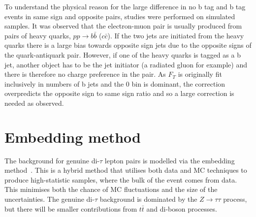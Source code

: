 To understand the physical reason for the large difference in no b tag and b tag events in same sign and opposite pairs, studies were performed on simulated samples.
It was observed that the electron-muon pair is usually produced from pairs of heavy quarks, $pp\rightarrow b\bar{b}$ ($c\bar{c}$).
If the two jets are initiated from the heavy quarks there is a large bias towards opposite sign jets due to the opposite signs of the quark-antiquark pair.
However, if one of the heavy quarks is tagged as a b jet, another object has to be the jet initiator (a radiated gluon for example) and there is therefore no charge preference in the pair.
As $F_{T}$ is originally fit inclusively in numbers of b jets and the 0 bin is dominant, the correction overpredicts the opposite sign to same sign ratio and so a large correction is needed as observed.

\section{Embedding method}
\label{sec:embedding}

The background for genuine di-$\tau$ lepton pairs is modelled via the embedding method~\cite{CMS_embedding}. 
This is a hybrid method that utilises both data and \ac{MC} techniques to produce high-statistic samples, where the bulk of the event comes from data.
This minimises both the chance of \ac{MC} fluctuations and the size of the uncertainties.
The genuine di-$\tau$ background is dominated by the $Z \rightarrow \tau \tau$ process, but there will be smaller contributions from $t\bar{t}$ and di-boson processes.  \\

